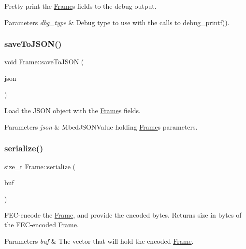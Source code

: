 Pretty-\/print the \hyperlink{classFrame}{Frame}\textquotesingle{}s fields to the debug output. 
\begin{DoxyParams}{Parameters}
{\em dbg\+\_\+type} & Debug type to use with the calls to debug\+\_\+printf(). \\
\hline
\end{DoxyParams}
\mbox{\label{classFrame_a865ca9d9a5584fab74d7258012509b97}} 
\subsubsection{\texorpdfstring{save\+To\+J\+S\+O\+N()}{saveToJSON()}}
{\footnotesize\ttfamily void Frame\+::save\+To\+J\+S\+ON (\begin{DoxyParamCaption}\item[{Mbed\+J\+S\+O\+N\+Value \&}]{json }\end{DoxyParamCaption})}

Load the J\+S\+ON object with the \hyperlink{classFrame}{Frame}\textquotesingle{}s fields. 
\begin{DoxyParams}{Parameters}
{\em json} & Mbed\+J\+S\+O\+N\+Value holding \hyperlink{classFrame}{Frame}\textquotesingle{}s parameters. \\
\hline
\end{DoxyParams}
\mbox{\label{classFrame_a8c202575665982edb827d04d2c2b705c}} 
\subsubsection{\texorpdfstring{serialize()}{serialize()}}
{\footnotesize\ttfamily size\+\_\+t Frame\+::serialize (\begin{DoxyParamCaption}\item[{vector$<$ uint8\+\_\+t $>$ \&}]{buf }\end{DoxyParamCaption})}

F\+E\+C-\/encode the \hyperlink{classFrame}{Frame}, and provide the encoded bytes. Returns size in bytes of the F\+E\+C-\/encoded \hyperlink{classFrame}{Frame}. 
\begin{DoxyParams}{Parameters}
{\em buf} & The vector that will hold the encoded \hyperlink{classFrame}{Frame}. \\
\hline
\end{DoxyParams}
\mbox{\label{classFrame_a950b26a59c2f2716662a09964e5d95d1}} 
